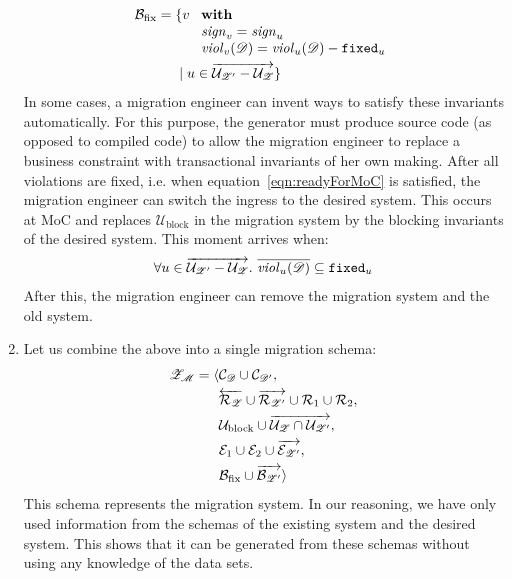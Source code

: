 \documentclass[runningheads]{llncs}
\newcommand{\id}[1]{\text{\it #1\/}}
\newcommand{\viol}[2]{\violC{#1}(#2)}
\newcommand{\violC}[1]{\id{viol}_{#1}}
\newcommand{\sign}[1]{\id{sign}_{#1}}
\newcommand{\concepts}{\mathcal{C}}
\newcommand{\rels}{\mathcal{R}}   %
\newcommand{\rules}{\mathcal{U}}
\newcommand{\transactions}{\mathcal{E}}
\newcommand{\busConstraints}{\mathcal{B}}
\newcommand{\dataset}{\mathscr{D}}
\newcommand{\schema}{\mathscr{Z}}
\newcommand{\migrsys}{\mathscr{M}}
\newcommand{\cmpl}[1]{\overline{#1}}
\begin{document}
\begin{enumerate}
   \begin{align}
      \busConstraints_\text{fix}={}&\{v\ 
      \begin{array}[t]{l}
         \text{\bf with}\label{eqn:Bfix}\\
         \sign{v}=\sign{u}\\
         \viol{v}{\dataset}=\viol{u}{\dataset}-{\tt fixed}_u
      \end{array}\\
      &\mid u\in\overrightarrow{\rules_{\schema'}-\rules_{\schema}}\}\notag
   \end{align}
   In some cases, a migration engineer can invent ways to satisfy these invariants automatically.
   For this purpose, the generator must produce source code (as opposed to compiled code) to allow the migration engineer
   to replace a business constraint with transactional invariants of her own making.
   After all violations are fixed, i.e. when equation~\ref{eqn:readyForMoC} is satisfied,
   the migration engineer can switch the ingress to the desired system.
   This occurs at MoC and
   replaces $\rules_\text{block}$ in the migration system by the blocking invariants of the desired system.
   This moment arrives when:
   \begin{align}
      \forall u\in\overrightarrow{\rules_{\schema'}-\rules_{\schema}}.~\cmpl{\viol{u}{\dataset}}\subseteq{\tt fixed}_u
   \label{eqn:readyForMoC}
   \end{align}
   After this, the migration engineer can remove the migration system and the old system.

\item Let us combine the above into a single migration schema:
   \begin{align}
      \schema_\migrsys=\langle{}&\concepts_\dataset\cup\concepts_{\dataset'},\label{eqn:schema migrsys}\\
      &\overleftarrow{\rels_{\schema}}\cup\overrightarrow{\rels_{\schema'}}\cup\rels_1\cup\rels_2,\notag\\
      &\rules_\text{block}\cup\overrightarrow{\rules_{\schema}\cap\rules_{\schema'}},\notag\\
      &\transactions_1\cup\transactions_2\cup\overrightarrow{\transactions_{\schema'}},\notag\\
      &\busConstraints_\text{fix}\cup\overrightarrow{\busConstraints_{\schema'}}\rangle\notag
   \end{align}
   This schema represents the migration system.
   In our reasoning, we have only used information from the schemas of the existing system and the desired system.
   This shows that it can be generated from these schemas without using any knowledge of the data sets.
\end{enumerate}
\end{document}
